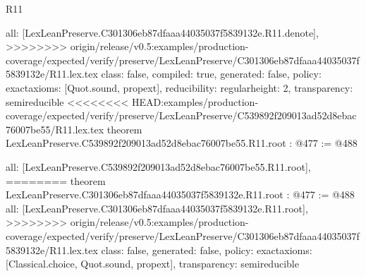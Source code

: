 \begin{lexlean}{R11}
\begin{coremodule}
{{{{{  all: [LexLeanPreserve.C301306eb87dfaaa44035037f5839132e.R11.denote],
>>>>>>>> origin/release/v0.5:examples/production-coverage/expected/verify/preserve/LexLeanPreserve/C301306eb87dfaaa44035037f5839132e/R11.lex.tex
  class: false,
  compiled: true,
  generated: false,
  policy: exact{axioms: [Quot.sound, propext]},
  reducibility: regular{height: 2},
  transparency: semireducible
}
<<<<<<<< HEAD:examples/production-coverage/expected/verify/preserve/LexLeanPreserve/C539892f209013ad52d8ebac76007be55/R11.lex.tex
theorem LexLeanPreserve.C539892f209013ad52d8ebac76007be55.R11.root : @477 := @488 {
  all: [LexLeanPreserve.C539892f209013ad52d8ebac76007be55.R11.root],
========
theorem LexLeanPreserve.C301306eb87dfaaa44035037f5839132e.R11.root : @477 := @488 {
  all: [LexLeanPreserve.C301306eb87dfaaa44035037f5839132e.R11.root],
>>>>>>>> origin/release/v0.5:examples/production-coverage/expected/verify/preserve/LexLeanPreserve/C301306eb87dfaaa44035037f5839132e/R11.lex.tex
  class: false,
  generated: false,
  policy: exact{axioms: [Classical.choice, Quot.sound, propext]},
  transparency: semireducible
}

}}}}}
\end{coremodule}
\end{lexlean}
